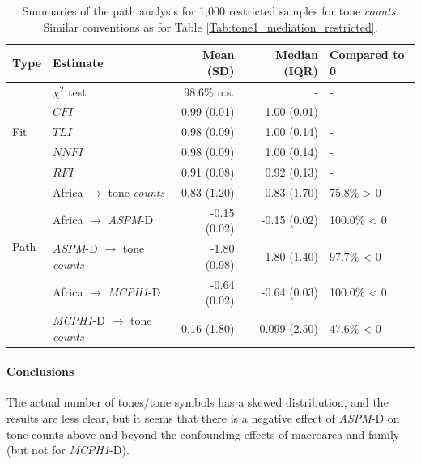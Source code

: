 \documentclass[twoside,onecolumn]{article}
\begin{document}
\begin{table}[h]
  \caption{Summaries of the path analysis for 1,000 restricted samples for tone \textit{counts}. Similar conventions as for Table \ref{Tab:tone1_mediation_restricted}.}
  \label{Tab:tone_counts_path_restricted}
  \centering
  \begin{tabular}{|l|l|r|r|l|}
    \toprule
    \textbf{Type} & \textbf{Estimate} & \textbf{Mean (SD)} & \textbf{Median (IQR)} & \textbf{Compared to 0} \\
    \midrule
    \multirow{5}{*}{Fit} & $\chi^2$ test & 98.6\% n.s. & - & - \\
    & $CFI$                              & 0.99 (0.01) & 1.00 (0.01) & - \\
    & $TLI$                              & 0.98 (0.09) & 1.00 (0.14) & - \\
    & $NNFI$                             & 0.98 (0.09) & 1.00 (0.14) & - \\
    & $RFI$                              & 0.91 (0.08) & 0.92 (0.13) & - \\
    \midrule
    \multirow{4}{*}{Path} & Africa $\rightarrow$ tone \textit{counts} &  0.83 (1.20) &  0.83 (1.70) & 75.8\%  > 0 \\
    & Africa $\rightarrow$ \textit{ASPM}-D                            & -0.15 (0.02) & -0.15 (0.02) & 100.0\% < 0 \\
    & \textit{ASPM}-D  $\rightarrow$ tone \textit{counts}             & -1.80 (0.98) & -1.80 (1.40) & 97.7\%  < 0 \\
    & Africa $\rightarrow$ \textit{MCPH1}-D                           & -0.64 (0.02) & -0.64 (0.03) & 100.0\% < 0 \\
    & \textit{MCPH1}-D $\rightarrow$ tone \textit{counts}             &  0.16 (1.80) & 0.099 (2.50) & 47.6\%  < 0 \\
    \bottomrule
  \end{tabular}
\end{table}


\paragraph{Conclusions}

The actual number of tones/tone symbols has a skewed distribution, and the results are less clear, but it seems that there is a negative effect of \textit{ASPM}-D on tone counts above and beyond the confounding effects of macroarea and family (but not for \textit{MCPH1}-D).
\end{document}
